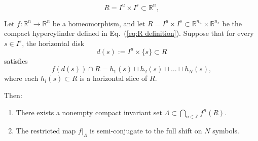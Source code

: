 \documentclass[10pt,a4paper]{amsart}
\begin{document}
\begin{equation}\label{eq:R definition}
R = I^u \times I^s \subset \mathbb{R}^n,
\end{equation}

\begin{proposition}\label{Semi-conjugacy to the full shift on N symbols}
Let \( f : \mathbb{R}^n \to \mathbb{R}^n \) be a homeomorphism, and let \( R = I^u \times I^s \subset \mathbb{R}^{n_u} \times \mathbb{R}^{n_s} \) be the compact hypercylinder defined in Eq.~(\ref{eq:R definition}). Suppose that for every \( s \in I^s \), the horizontal disk
\[
d(s) := I^u \times \{s\} \subset R
\]
satisfies
\[
f(d(s)) \cap R = h_1(s) \sqcup h_2(s) \sqcup \dots \sqcup h_N(s),
\]
where each \( h_i(s) \subset R \) is a horizontal slice of \( R \).

Then:
\begin{enumerate}
    \item There exists a nonempty compact invariant set \( \Lambda \subset \bigcap_{n \in \mathbb{Z}} f^n(R) \).
    \item The restricted map \( f|_\Lambda \) is semi-conjugate to the full shift on \( N \) symbols.
\end{enumerate}
\end{proposition}
\end{document}
